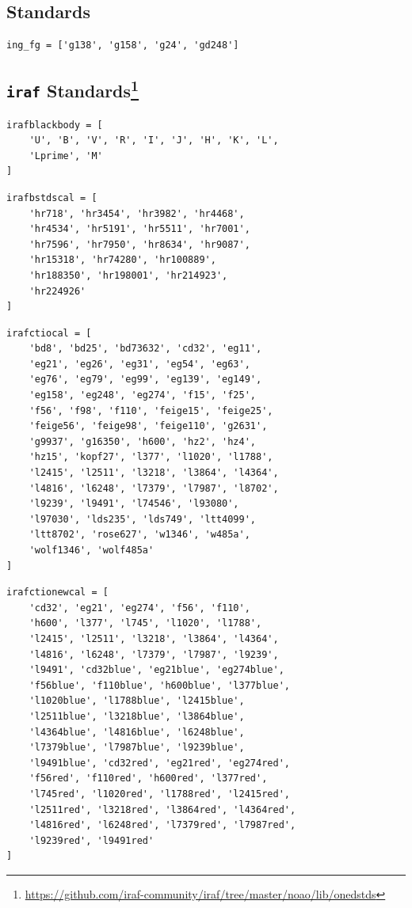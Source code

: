 \documentclass[fleqn,usenatbib]{mnras}
\begin{document}
\subsection*{\citet{1984PASP...96..530F} Standards}
\begin{verbatim}
ing_fg = ['g138', 'g158', 'g24', 'gd248']
\end{verbatim}

\subsection{\texttt{iraf} Standards\footnote{\url{https://github.com/iraf-community/iraf/tree/master/noao/lib/onedstds}}}
\begin{verbatim}
irafblackbody = [
    'U', 'B', 'V', 'R', 'I', 'J', 'H', 'K', 'L',
    'Lprime', 'M'
]
\end{verbatim}

\begin{verbatim}
irafbstdscal = [
    'hr718', 'hr3454', 'hr3982', 'hr4468',
    'hr4534', 'hr5191', 'hr5511', 'hr7001',
    'hr7596', 'hr7950', 'hr8634', 'hr9087',
    'hr15318', 'hr74280', 'hr100889',
    'hr188350', 'hr198001', 'hr214923',
    'hr224926'
]
\end{verbatim}

\begin{verbatim}
irafctiocal = [
    'bd8', 'bd25', 'bd73632', 'cd32', 'eg11',
    'eg21', 'eg26', 'eg31', 'eg54', 'eg63',
    'eg76', 'eg79', 'eg99', 'eg139', 'eg149',
    'eg158', 'eg248', 'eg274', 'f15', 'f25',
    'f56', 'f98', 'f110', 'feige15', 'feige25',
    'feige56', 'feige98', 'feige110', 'g2631',
    'g9937', 'g16350', 'h600', 'hz2', 'hz4',
    'hz15', 'kopf27', 'l377', 'l1020', 'l1788',
    'l2415', 'l2511', 'l3218', 'l3864', 'l4364',
    'l4816', 'l6248', 'l7379', 'l7987', 'l8702',
    'l9239', 'l9491', 'l74546', 'l93080',
    'l97030', 'lds235', 'lds749', 'ltt4099',
    'ltt8702', 'rose627', 'w1346', 'w485a',
    'wolf1346', 'wolf485a'
]
\end{verbatim}

\begin{verbatim}
irafctionewcal = [
    'cd32', 'eg21', 'eg274', 'f56', 'f110',
    'h600', 'l377', 'l745', 'l1020', 'l1788',
    'l2415', 'l2511', 'l3218', 'l3864', 'l4364',
    'l4816', 'l6248', 'l7379', 'l7987', 'l9239',
    'l9491', 'cd32blue', 'eg21blue', 'eg274blue',
    'f56blue', 'f110blue', 'h600blue', 'l377blue',
    'l1020blue', 'l1788blue', 'l2415blue',
    'l2511blue', 'l3218blue', 'l3864blue',
    'l4364blue', 'l4816blue', 'l6248blue',
    'l7379blue', 'l7987blue', 'l9239blue',
    'l9491blue', 'cd32red', 'eg21red', 'eg274red',
    'f56red', 'f110red', 'h600red', 'l377red',
    'l745red', 'l1020red', 'l1788red', 'l2415red',
    'l2511red', 'l3218red', 'l3864red', 'l4364red',
    'l4816red', 'l6248red', 'l7379red', 'l7987red',
    'l9239red', 'l9491red'
]
\end{verbatim}
\end{document}

